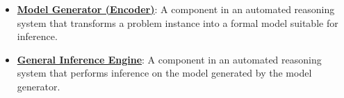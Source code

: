 \documentclass{article}%
\begin{document}
\begin{itemize}[leftmargin=*]
\item \href{https://purdue.brightspace.com/d2l/common/assets/pdfjs-d2l-dist/1.0.14-legacy/web/viewer.html?file=\%2Fcontent\%2Fenforced\%2F1095467-wl.202510.CS.24300.001\%2F15L2-SAT.pdf\%3Fou\%3D1095467\&lang=en-us\&container=d2l-fileviewer-rendered-pdf\&fullscreen=d2l-fileviewer-rendered-pdf-dialog\&height=667#page=3}{\textbf{Model Generator (Encoder)}}: A component in an automated reasoning system that transforms a problem instance into a formal model suitable for inference.%
\item \href{https://purdue.brightspace.com/d2l/common/assets/pdfjs-d2l-dist/1.0.14-legacy/web/viewer.html?file=\%2Fcontent\%2Fenforced\%2F1095467-wl.202510.CS.24300.001\%2F15L2-SAT.pdf\%3Fou\%3D1095467\&lang=en-us\&container=d2l-fileviewer-rendered-pdf\&fullscreen=d2l-fileviewer-rendered-pdf-dialog\&height=667#page=3}{\textbf{General Inference Engine}}: A component in an automated reasoning system that performs inference on the model generated by the model generator.%
\end{itemize}%
\end{document}
